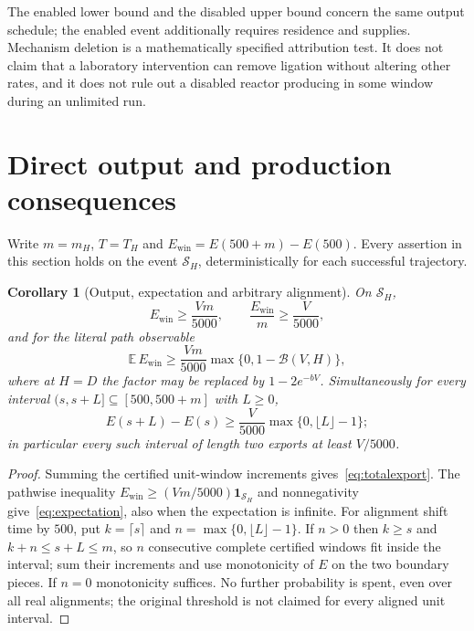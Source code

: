 \documentclass[11pt,a4paper]{article}
\theoremstyle{plain}
\newtheorem{corollary}[theorem]{Corollary}
\theoremstyle{definition}
\theoremstyle{remark}
\newcommand{\E}{\mathbb E}
\newcommand{\ind}{\mathbf 1}
\newcommand{\Son}{\mathcal S}
\newcommand{\Ewin}{E_{\mathrm{win}}}
\begin{document}
The enabled lower bound and the disabled upper bound concern the same output schedule; the enabled event additionally requires residence and supplies. Mechanism deletion is a mathematically specified attribution test. It does not claim that a laboratory intervention can remove ligation without altering other rates, and it does not rule out a disabled reactor producing in some window during an unlimited run.

\section{Direct output and production consequences}\label{sec:consequences}

Write $m=m_H$, $T=T_H$ and $\Ewin=E(500+m)-E(500)$. Every assertion in this section holds on the event $\Son_H$, deterministically for each successful trajectory.

\begin{corollary}[Output, expectation and arbitrary alignment]\label{cor:output}
On $\Son_H$,
\begin{equation}\label{eq:totalexport}
 \Ewin\ge\frac{Vm}{5000},\qquad\frac{\Ewin}m\ge\frac V{5000},
\end{equation}
and for the literal path observable
\begin{equation}\label{eq:expectation}
 \E\,\Ewin\ge\frac{Vm}{5000}\max\{0,1-\mathcal B(V,H)\},
\end{equation}
where at $H=D$ the factor may be replaced by $1-2e^{-bV}$. Simultaneously for every interval $(s,s+L]\subseteq[500,500+m]$ with $L\ge0$,
\begin{equation}\label{eq:alignment}
 E(s+L)-E(s)\ge\frac V{5000}\max\{0,\lfloor L\rfloor-1\};
\end{equation}
in particular every such interval of length two exports at least $V/5000$.
\end{corollary}
\begin{proof}
Summing the certified unit-window increments gives~\eqref{eq:totalexport}. The pathwise inequality $\Ewin\ge(Vm/5000)\ind_{\Son_H}$ and nonnegativity give~\eqref{eq:expectation}, also when the expectation is infinite. For alignment shift time by $500$, put $k=\lceil s\rceil$ and $n=\max\{0,\lfloor L\rfloor-1\}$. If $n>0$ then $k\ge s$ and $k+n\le s+L\le m$, so $n$ consecutive complete certified windows fit inside the interval; sum their increments and use monotonicity of $E$ on the two boundary pieces. If $n=0$ monotonicity suffices. No further probability is spent, even over all real alignments; the original threshold is not claimed for every aligned unit interval.
\end{proof}
\end{document}
